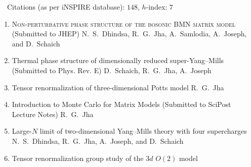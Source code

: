  {\faLeanpub}
~~Citations (as per iNSPIRE database): $148$, $h$-index: $7$
\begin{enumerate}
\item \textsc{Non-perturbative phase structure of the bosonic BMN matrix model}  \newline 
\hfill  \texttt{\textbf{}} (Submitted to JHEP) \newline 
N.~S.~Dhindsa, R.~G.~Jha, A.~Samlodia, A.~Joseph, and D.~Schaich
\vspace{1mm} 
\item Thermal phase structure of dimensionally reduced super-Yang--Mills \newline 
\texttt{\textbf{}} (Submitted to Phys. Rev. E) \newline 
D.~Schaich, R.~G.~Jha, A.~Joseph
\vspace{1mm} 
\item Tensor renormalization of three-dimensional Potts model  \newline 
\texttt{\textbf{}} \newline 
R.~G.~Jha
\vspace{1mm} 
 \item Introduction to Monte Carlo for Matrix Models \newline 
 \texttt{\textbf{}} (Submitted to SciPost Lecture Notes) \newline 
 R.~G.~Jha
 \vspace{1mm} 
 \item Large-$N$ limit of two-dimensional Yang--Mills theory with four supercharges \newline 
 \texttt{\textbf{}} \newline 
 N.~S.~Dhindsa, R.~G.~Jha, A.~Joseph, and D.~Schaich
 \vspace{1mm}  
 \item Tensor renormalization group study of the $3d$ $O(2)$ model \newline 

\end{enumerate}
